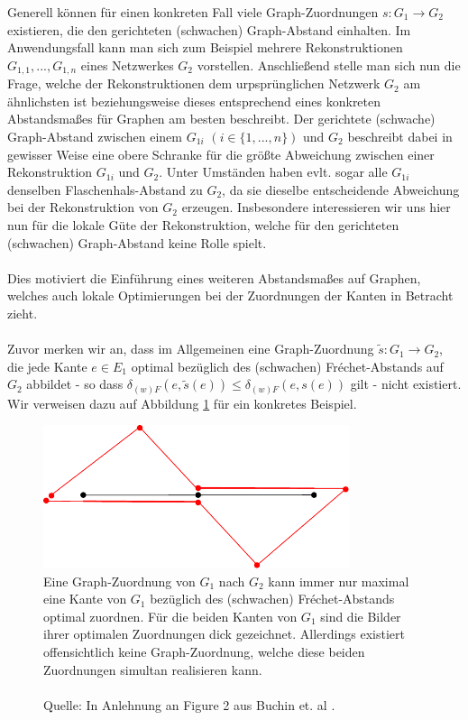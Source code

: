 \documentclass[a4paper, 12pt, twoside]{article}
\theoremstyle{Format1} %
\begin{document}
Generell können für einen konkreten Fall viele Graph-Zuordnungen $s: G_1 \to G_2$ existieren, die den gerichteten (schwachen) Graph-Abstand einhalten.
Im Anwendungsfall kann man sich zum Beispiel mehrere Rekonstruktionen $G_{1,1}, ..., G_{1,n}$ eines Netzwerkes $G_2$ vorstellen.
Anschließend stelle man sich nun die Frage, welche der Rekonstruktionen dem urpsprünglichen Netzwerk $G_2$ am ähnlichsten ist beziehungsweise dieses entsprechend eines konkreten Abstandsmaßes
für Graphen am besten beschreibt.
Der gerichtete (schwache) Graph-Abstand zwischen einem $G_{1i}$ $(i \in \{1,...,n\})$ und $G_2$ beschreibt dabei in gewisser Weise eine obere Schranke für die größte Abweichung zwischen
einer Rekonstruktion $G_{1i}$ und $G_2$.
Unter Umständen haben evlt. sogar alle $G_{1i}$ denselben Flaschenhals-Abstand zu $G_2$, da sie dieselbe entscheidende Abweichung bei der Rekonstruktion von $G_2$ erzeugen.
Insbesondere interessieren wir uns hier nun für die lokale Güte der Rekonstruktion, welche für den gerichteten (schwachen) Graph-Abstand keine Rolle spielt.
\\
\\
Dies motiviert die Einführung eines weiteren Abstandsmaßes auf Graphen, welches auch lokale Optimierungen bei der Zuordnungen der Kanten in Betracht zieht.
\\
\\
Zuvor merken wir an, dass im Allgemeinen eine Graph-Zuordnung $\tilde{s}: G_1 \to G_2$, die jede Kante $e \in E_1$ optimal bezüglich des (schwachen)
Fréchet-Abstands auf $G_2$ abbildet - so dass $\delta_{(w)F}(e, \tilde{s}(e)) \leq \delta_{(w)F}(e, s(e))$ gilt - nicht existiert. Wir verweisen dazu auf
Abbildung \ref{chapter_2_example_0} für ein konkretes Beispiel.

\begin{figure}[H]
    \centering
    \includegraphics[width=0.8\textwidth]{chapter_2_example_0.pdf}
	\caption{Eine Graph-Zuordnung von $G_1$ nach $G_2$ kann immer nur maximal eine Kante von $G_1$ bezüglich des (schwachen) Fréchet-Abstands optimal zuordnen.
	Für die beiden Kanten von $G_1$ sind die Bilder ihrer optimalen Zuordnungen dick gezeichnet. Allerdings existiert offensichtlich keine Graph-Zuordnung,
	welche diese beiden Zuordnungen simultan realisieren kann.
	\\
	\\
	Quelle: In Anlehnung an Figure 2 aus Buchin et. al \cite{Buchin}.
	}
    \label{chapter_2_example_0}
\end{figure}
\end{document}

